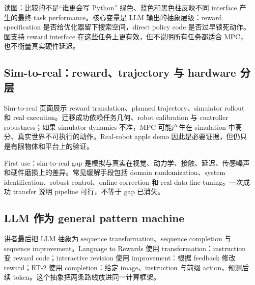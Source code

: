 \begin{knowledgebox}{读图：比较的不是“谁更会写 Python”}
绿色、蓝色和黑色柱反映不同 interface 产生的最终 task performance。核心变量是 LLM 输出的抽象层级：reward specification 是否给优化器留下搜索空间，direct policy code 是否过早锁死动作。图支持 reward interface 在这些任务上更有效，但不说明所有任务都适合 MPC，也不衡量真实硬件延迟。
\end{knowledgebox}

\subsection{Sim-to-real：reward、trajectory 与 hardware 分层}

Sim-to-real 页面展示 reward translation、planned trajectory、simulator rollout 和 real execution。迁移成功依赖任务几何、robot calibration 与 controller robustness；如果 simulator dynamics 不准，MPC 可能产生在 simulation 中高分、真实世界不可执行的动作。Real-robot apple demo 因此是必要证据，但仍只是有限物体和平台上的验证。



\begin{warningbox}{First use：sim-to-real gap}
 是模拟与真实在视觉、动力学、接触、延迟、传感噪声和硬件磨损上的差异。常见缓解手段包括 domain randomization、system identification、robust control、online correction 和 real-data fine-tuning。一次成功 transfer 说明 pipeline 可行，不等于 gap 已消失。
\end{warningbox}

\subsection{LLM 作为 general pattern machine}

讲者最后把 LLM 抽象为 sequence transformation、sequence completion 与 sequence improvement。Language to Rewards 使用 transformation：instruction 变 reward code；interactive revision 使用 improvement：根据 feedback 修改 reward；RT-2 使用 completion：给定 image、instruction 与前缀 action，预测后续 token。这个抽象把两条路线放进同一计算框架。



